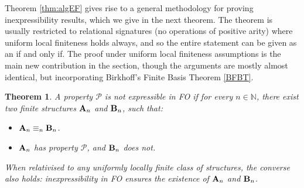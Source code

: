 \documentclass[10pt,a4paper]{amsart}
\theoremstyle{plain}
\newtheorem{thm}{Theorem}[section]
\theoremstyle{definition}
\newcommand{\up}[1]{\textup{#1}}
\begin{document}
Theorem \ref{thm:algEF} gives rise to a general methodology for proving inexpressibility results, which we give in the next theorem.  The  theorem is usually restricted to relational signatures (no operations of positive arity) where uniform local finiteness holds always, and so the entire statement can be given as an if and only if.  The proof under uniform local finiteness assumptions is the main new contribution in the section, though the arguments are mostly almost identical, but incorporating Birkhoff's Finite Basis Theorem \ref{BFBT}.
\begin{thm}\label{thm:meth}
A property $\mathcal{P}$ is not expressible in FO if for every $n\in \mathbb{N}$, there exist two finite structures ${\bf A}_n$ and ${\bf B}_n$, such that\up:
\begin{itemize}
\item ${\bf A}_n\equiv_n{\bf B}_n$.
\item ${\bf A}_n$ has property $\mathcal{P}$, and ${\bf B}_n$ does not.
\end{itemize}
When relativised to any uniformly locally finite class of structures, the converse also holds\up: inexpressibility in FO ensures the existence of ${\bf A}_n$ and ${\bf B}_n$.
\end{thm}
    
\end{document}
